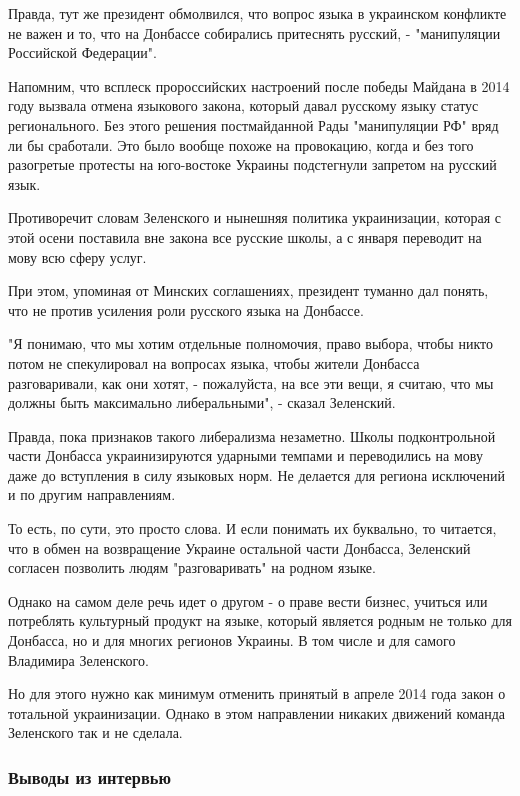 {Правда, тут же президент обмолвился, что вопрос языка в украинском конфликте не
важен и то, что на Донбассе собирались притеснять русский, - "манипуляции
Российской Федерации".

Напомним, что всплеск пророссийских настроений после победы Майдана в 2014 году
вызвала отмена языкового закона, который давал русскому языку статус
регионального. Без этого решения постмайданной Рады "манипуляции РФ" вряд ли бы
сработали. Это было вообще похоже на провокацию, когда и без того разогретые
протесты на юго-востоке Украины подстегнули запретом на русский язык. 

Противоречит словам Зеленского и нынешняя политика украинизации, которая с этой
осени поставила вне закона все русские школы, а с января переводит на мову всю
сферу услуг.

При этом, упоминая от Минских соглашениях, президент туманно дал понять, что не
против усиления роли русского языка на Донбассе. 

"Я понимаю, что мы хотим отдельные полномочия, право выбора, чтобы никто потом
не спекулировал на вопросах языка, чтобы жители Донбасса разговаривали, как они
хотят, - пожалуйста, на все эти вещи, я считаю, что мы должны быть максимально
либеральными", - сказал Зеленский. 

Правда, пока признаков такого либерализма незаметно. Школы подконтрольной части
Донбасса украинизируются ударными темпами и переводились на мову даже до
вступления в силу языковых норм. Не делается для региона исключений и по другим
направлениям.

То есть, по сути, это просто слова. И если понимать их буквально, то читается,
что в обмен на возвращение Украине остальной части Донбасса, Зеленский согласен
позволить людям "разговаривать" на родном языке. 

Однако на самом деле речь идет о другом - о праве вести бизнес, учиться или
потреблять культурный продукт на языке, который является родным не только для
Донбасса, но и для многих регионов Украины. В том числе и для самого Владимира
Зеленского. 

Но для этого нужно как минимум отменить принятый в апреле 2014 года закон о
тотальной украинизации. Однако в этом направлении никаких движений команда
Зеленского так и не сделала.

\subsubsection{Выводы из интервью}

}
